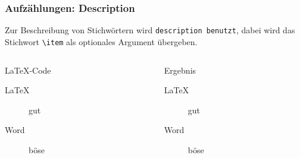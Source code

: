\begin{frame}[fragile]
    \frametitle{Aufzählungen: Description}
    Zur Beschreibung von Stichwörtern wird \texttt{description benutzt}, dabei wird das
    Stichwort \verb-\item- als optionales Argument übergeben.
    \begin{columns}[t]
        \begin{column}{0.47\textwidth}
            \begin{block}{\LaTeX-Code}
                \begin{lstverbatim}
                \begin{description}
                    \item[\LaTeX] gut
                    \item[Word] böse
                \end{description}
                \end{lstverbatim}
            \end{block}
        \end{column}
        \begin{column}{0.47\textwidth}
            \begin{block}{Ergebnis}
                \begin{description}
                    \item[\LaTeX] gut
                    \item[Word] böse
                \end{description}
            \end{block} 
        \end{column}
    \end{columns}
\end{frame}
